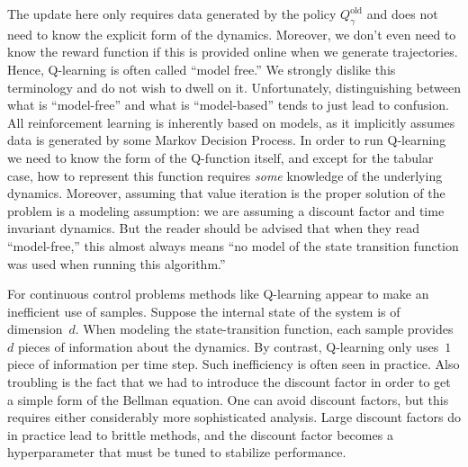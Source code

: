 \documentclass{tufte-book}
\begin{document}
The update here only requires data generated by the policy
\(Q_\gamma^{\mathrm{old}}\) and does not need to know the explicit form
of the dynamics. Moreover, we don't even need to know the reward
function if this is provided online when we generate trajectories.
Hence, Q-learning is often called ``model free.'' We strongly dislike
this terminology and do not wish to dwell on it. Unfortunately,
distinguishing between what is ``model-free'' and what is
``model-based'' tends to just lead to confusion. All reinforcement
learning is inherently based on models, as it implicitly assumes data is
generated by some Markov Decision Process. In order to run Q-learning we
need to know the form of the Q-function itself, and except for the
tabular case, how to represent this function requires \emph{some}
knowledge of the underlying dynamics. Moreover, assuming that value
iteration is the proper solution of the problem is a modeling
assumption: we are assuming a discount factor and time invariant
dynamics. But the reader should be advised that when they read
``model-free,'' this almost always means ``no model of the state
transition function was used when running this algorithm.''

For continuous control problems methods like Q-learning appear to make
an inefficient use of samples. Suppose the internal state of the system
is of dimension~\(d\). When modeling the state-transition function, each
sample provides~\(d\) pieces of information about the dynamics. By
contrast, Q-learning only uses~\(1\) piece of information per time step.
Such inefficiency is often seen in practice. Also troubling is the fact
that we had to introduce the discount factor in order to get a simple
form of the Bellman equation. One can avoid discount factors, but this
requires either considerably more sophisticated analysis. Large discount
factors do in practice lead to brittle methods, and the discount factor
becomes a hyperparameter that must be tuned to stabilize performance.
\end{document}
